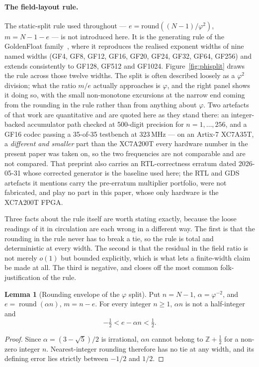 \documentclass[11pt]{article}
\theoremstyle{definition}
\newtheorem{lemma}[theorem]{Lemma}
\begin{document}
\paragraph{The field-layout rule.} The static-split rule used throughout ---
$e=\mathrm{round}((N-1)/\varphi^{2})$, $m=N-1-e$ --- is not introduced here. It
is the generating rule of the GoldenFloat family~\cite{goldenfloat}, where it
reproduces the realised exponent widths of nine named widths (GF4, GF8, GF12,
GF16, GF20, GF24, GF32, GF64, GF256) and extends consistently to GF128, GF512
and GF1024. Figure~\ref{fig:phisplit} draws the rule across those twelve widths.
The split is often described loosely as a $\varphi^{2}$ division; what the ratio
$m/e$ actually approaches is $\varphi$, and the right panel shows it doing so,
with the small non-monotone excursions at the narrow end coming from the rounding
in the rule rather than from anything about $\varphi$. Two artefacts of that work
are quantitative and are quoted here as they stand there: an integer-backed
accumulator path checked at 500-digit precision for $n=1,\dots,256$, and a GF16
codec passing a 35-of-35 testbench at $323$\,MHz --- on an Artix-7 XC7A35T, a
\emph{different and smaller} part than the XC7A200T every hardware number in the
present paper was taken on, so the two frequencies are not comparable and are
not compared. That preprint also carries an RTL-correctness erratum dated
2026-05-31 whose corrected generator is the baseline used here; the RTL and GDS
artefacts it mentions carry the pre-erratum multiplier portfolio, were not
fabricated, and play no part in this paper, whose only hardware is the XC7A200T
FPGA.

Three facts about the rule itself are worth stating exactly, because the loose
readings of it in circulation are each wrong in a different way. The first is that
the rounding in the rule never has to break a tie, so the rule is total and
deterministic at every width. The second is that the residual in the field ratio
is not merely $o(1)$ but bounded explicitly, which is what lets a finite-width
claim be made at all. The third is negative, and closes off the most common
folk-justification of the rule.

\begin{lemma}[Rounding envelope of the $\varphi$ split]
\label{lem:phi-rounding-envelope}
Put $n=N-1$, $\alpha=\varphi^{-2}$, and $e=\operatorname{round}(\alpha n)$,
$m=n-e$. For every integer $n\geq1$, $\alpha n$ is not a half-integer and
\[
 -\tfrac12 < e-\alpha n < \tfrac12 .
\]
\end{lemma}
\begin{proof}
Since $\alpha=(3-\sqrt5)/2$ is irrational, $\alpha n$ cannot belong to
$\mathbb{Z}+\tfrac12$ for a non-zero integer $n$. Nearest-integer rounding
therefore has no tie at any width, and its defining error lies strictly between
$-1/2$ and $1/2$.
\end{proof}
\end{document}

